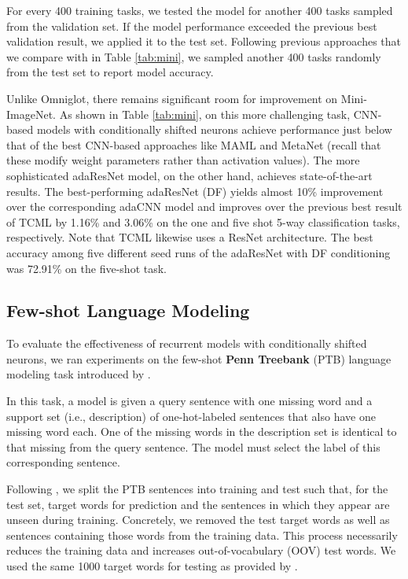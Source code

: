 \documentclass{article}
\begin{document}
For every 400 training tasks, we tested the model for another 400 tasks sampled from the validation set. If the model performance exceeded the previous best validation result, we applied it to the test set. Following previous approaches that we compare with in Table \ref{tab:mini}, we sampled another 400 tasks randomly from the test set to report model accuracy.

Unlike Omniglot, there remains significant room for improvement on Mini-ImageNet.
As shown in Table \ref{tab:mini}, on this more challenging task, CNN-based models with conditionally shifted neurons achieve performance just below that of the best CNN-based approaches like MAML
and MetaNet
(recall that these modify weight parameters rather than activation values). The more sophisticated adaResNet model, on the other hand, achieves state-of-the-art results. The best-performing adaResNet (DF) yields almost 10\% improvement over the corresponding adaCNN model and improves over the previous best result of TCML by 1.16\% and 3.06\% on the one and five shot 5-way classification tasks, respectively. Note that TCML likewise uses a ResNet architecture.
The best accuracy among five different seed runs of the adaResNet with DF conditioning was 72.91\% on the five-shot task.

\subsection{Few-shot Language Modeling}

To evaluate the effectiveness of recurrent models with conditionally shifted neurons, we ran experiments on the few-shot \textbf{Penn Treebank} (PTB) language modeling task introduced by \citet{vinyals2016matching}.

In this task, a model is given a query sentence with one missing word and a support set (i.e., description) of one-hot-labeled sentences that also have one missing word each. One of the missing words in the description set is identical to that missing from the query sentence. The model must select the label of this corresponding sentence.

Following \citet{vinyals2016matching}, we split the PTB sentences into training and test such that, for the test set, target words for prediction and the sentences in which they appear are unseen during training. Concretely, we removed the test target words as well as sentences containing those words from the training data. This process necessarily reduces the training data and increases out-of-vocabulary (OOV) test words. We used the same 1000 target words for testing as provided by \citet{vinyals2016matching}.
\end{document}
